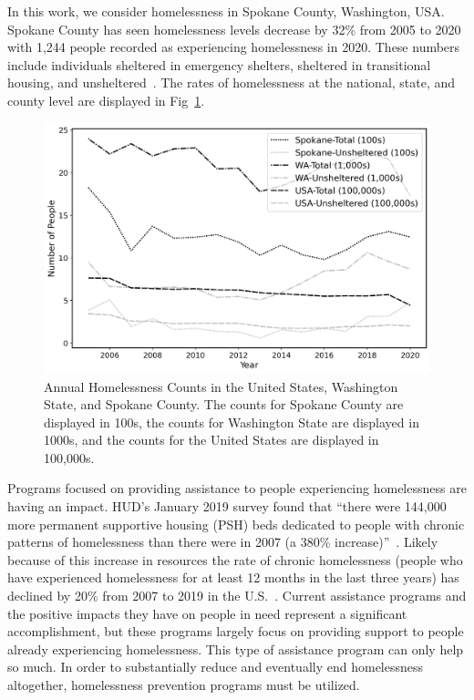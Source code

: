 \documentclass[10pt,letterpaper]{article}
\begin{document}
In this work, we consider homelessness in Spokane County, Washington, USA.  Spokane County has seen  homelessness levels decrease by 32\% from 2005 to 2020 with 1,244 people recorded as experiencing homelessness in 2020. These numbers include individuals sheltered in emergency shelters, sheltered in transitional housing, and unsheltered~\cite{PITcount}. The rates of homelessness at the national, state, and county level are displayed in Fig~\ref{fig:homelessness_counts}.

\begin{figure}[h]
    \includegraphics[width=\textwidth]{../img/homelessness_all.png}
    \caption{Annual Homelessness Counts in the United States, Washington State, and Spokane County. The counts for Spokane County are displayed in 100s, the counts for Washington State are displayed in 1000s, and the counts for the United States are displayed in 100,000s.~\cite{PITcount}}
    \label{fig:homelessness_counts}
\end{figure}

Programs focused on providing assistance to people experiencing homelessness are having an impact. HUD's January 2019 survey found that ``there were 144,000 more permanent supportive housing (PSH) beds dedicated to people with chronic patterns of homelessness than there were in 2007 (a 380\% increase)''~\cite{2019AHAR}. Likely because of this increase in resources the rate of chronic homelessness (people who have experienced homelessness for at least 12 months in the last three years) has declined by 20\% from 2007 to 2019 in the U.S.~\cite{2019AHAR}. Current assistance programs and the positive impacts they have on people in need represent a significant accomplishment, but these programs largely focus on providing support to people already experiencing homelessness. This type of assistance program can only help so much. In order to substantially reduce and eventually end homelessness altogether, homelessness prevention programs must be utilized. 
\end{document}
